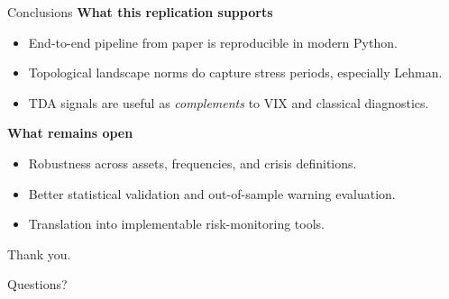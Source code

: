 \documentclass[aspectratio=169,10pt]{beamer}
\begin{document}
\begin{frame}{Conclusions}
\textbf{What this replication supports}
\begin{itemize}
  \item End-to-end pipeline from paper is reproducible in modern Python.
  \item Topological landscape norms do capture stress periods, especially Lehman.
  \item TDA signals are useful as \emph{complements} to VIX and classical diagnostics.
\end{itemize}

\textbf{What remains open}
\begin{itemize}
  \item Robustness across assets, frequencies, and crisis definitions.
  \item Better statistical validation and out-of-sample warning evaluation.
  \item Translation into implementable risk-monitoring tools.
\end{itemize}
\end{frame}


\begin{frame}
\centering
\Large Thank you.
\vspace{0.6em}

\normalsize Questions?
\end{frame}
\end{document}
